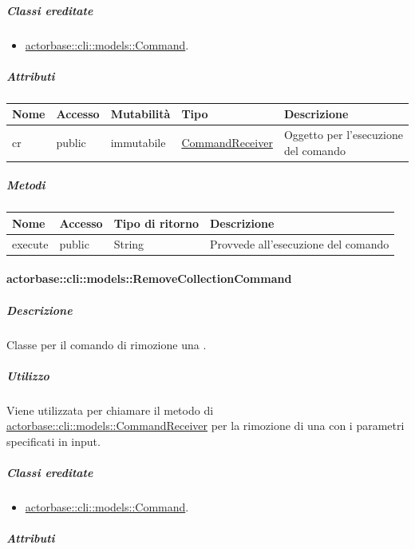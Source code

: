 \documentclass{scalatekids-article}
\begin{document}
\subparagraph{Classi ereditate}

\begin{itemize}
\item \hyperref[sec:actorbase::cli::models::Command]{actorbase::cli::models::Command}.
\end{itemize}

\subparagraph{Attributi}

\begin{tabular}{| p{1cm} | p{1.5cm} | p{2cm} | p{4cm} | p{8.5cm} |}
  \hline
  Nome & Accesso & Mutabilità & Tipo & Descrizione\\
  \hline
  cr & public & immutabile & \hyperref[sec:actorbase::cli::models::CommandReceiver]{CommandReceiver} & Oggetto per l'esecuzione del comando\\
  \hline
\end{tabular}

\subparagraph{Metodi}

\begin{tabular}{| l | l | l | l |}
  \hline
  Nome & Accesso & Tipo di ritorno & Descrizione\\
  \hline
  execute & public & String & Provvede all'esecuzione del comando\\
  \hline
\end{tabular}

\paragraph{actorbase::cli::models::RemoveCollectionCommand}
\label{sec:actorbase::cli::models::RemoveCollectionCommand}

\subparagraph{Descrizione}

Classe per il comando di rimozione una .

\subparagraph{Utilizzo}

Viene utilizzata per chiamare il metodo di
\hyperref[sec:actorbase::cli::models::CommandReceiver]{actorbase::cli::models::CommandReceiver} per la rimozione di una  con
i parametri specificati in input.

\subparagraph{Classi ereditate}

\begin{itemize}
\item \hyperref[sec:actorbase::cli::models::Command]{actorbase::cli::models::Command}.
\end{itemize}

\subparagraph{Attributi}
\end{document}
